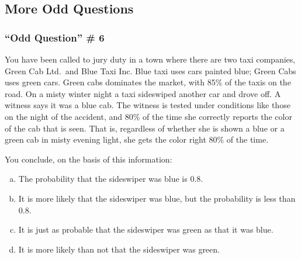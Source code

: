 \documentclass{beamer}
\begin{document}
\begin{singlespace}

\section{More Odd Questions}
\begin{frame}
\frametitle{``Odd Question'' \# 6}
	\small
	You have been called to jury duty in a town where there are two taxi companies, Green Cab Ltd.\ 
	and Blue Taxi Inc. Blue taxi uses cars painted blue; Green Cabs uses green cars. Green cabs 
	dominates the market, with 85\% of the taxis on the road. On a misty winter night a taxi 
	sideswiped another car and drove off. A witness says it was a blue cab. The witness is tested 
	under conditions like those on the night of the accident, and 80\% of the time she correctly 
	reports the color of the cab that is seen. That is, regardless of whether she is shown a blue or a 
	green cab in misty evening light, she gets the color right 80\% of the time.

	You conclude, on the basis of this information:
	\begin{enumerate}[(a)]
		\item The probability that the sideswiper was blue is 0.8.
		\item It is more likely that the sideswiper was blue, but the probability is less than 0.8. 
		\item It is just as probable that the sideswiper was green as that it was blue. 
		\item It is more likely than not that the sideswiper was green.
	\end{enumerate}
\end{frame}


\end{singlespace}
\end{document}
